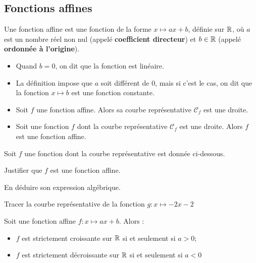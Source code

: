 \documentclass{poly}
\begin{document}
\subsection{Fonctions affines}
\begin{definition}
Une fonction affine est une fonction de la forme $x \mapsto ax + b$, définie sur $\mathbb{R}$, où $a$ est un nombre réel non nul (appelé \textbf{coefficient directeur}) et $b \in \mathbb{R}$ (appelé \textbf{ordonnée à l'origine}).
\end{definition}
\begin{remark}
\hfill
\begin{itemize}
\item Quand $b = 0$, on dit que la fonction est linéaire. 
\item La définition impose que $a$ soit différent de $0$, mais si c'est le cas, on dit que la fonction $x \mapsto b$ est une fonction constante.
\end{itemize}
\end{remark}
\begin{proposition}
\hfill
\begin{itemize}
\item Soit $f$ une fonction affine. Alors sa courbe représentative $\mathcal{C}_f$ est une droite.
\item Soit une fonction $f$ dont la courbe représentative $\mathcal{C}_f$ est une droite. Alors $f$ est une fonction affine.
\end{itemize}
\end{proposition}
\begin{example}
Soit $f$ une fonction dont la courbe représentative est donnée ci-dessous.
\begin{center}
\end{center}
\begin{alphaquestions}
\item Justifier que $f$ est une fonction affine.
\item En déduire son expression algébrique.
\item Tracer la courbe représentative de la fonction $g : x \mapsto -2x -2$
\end{alphaquestions}
\end{example}
\begin{proposition}
Soit une fonction affine $f : x \mapsto ax + b$. Alors :
\begin{itemize}
\item $f$ est strictement croissante sur $\mathbb{R}$ si et seulement si $a > 0$; 
\item $f$ est strictement décroissante sur $\mathbb{R}$ si et seulement si $a < 0$ 
\end{itemize}
\end{proposition}
\end{document}
